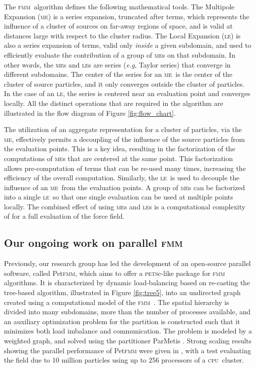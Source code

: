 \documentclass[10pt,twocolumn]{article}
\newcommand{\petfmm}{Pet\textsc{fmm}\xspace}
\newcommand{\petsc}{\textsc{pets}c\xspace}
\newcommand{\fmm}{\textsc{fmm}\xspace}
\newcommand{\cpu}{\textsc{cpu}}
\newcommand{\ME}{\textsc{me}}
\newcommand{\LE}{\textsc{le}}
\newlength{\up}
\begin{document}
The \fmm\ algorithm defines the following mathematical tools. The Multipole Expansion (\ME) is a series expansion, truncated after  terms, which represents the influence of a cluster of sources on far-away regions of space, and is valid at distances large with respect to the cluster radius. The Local Expansion (\LE) is also a series expansion of  terms, valid only \emph{inside} a given subdomain, and used to efficiently evaluate the contribution of a group of \ME s on that subdomain.
In other words, the \ME s and \LE s are series (\emph{e.g}, Taylor series) that converge in different subdomains. The center of the series for an \ME\ is the center of the cluster of source particles, and it only converges outside the cluster of particles. In the case of an \LE, the series is centered near an evaluation point and converges locally. All the distinct operations that are required in the algorithm are illustrated in the flow diagram of Figure \ref{fig:flow_chart}.

The utilization of an aggregate representation for a cluster of particles, via the \ME, effectively permits a decoupling of the influence of the source particles from the evaluation points.  This is a key idea, resulting in the factorization of the computations of \ME s that are centered at the same point.  This factorization allows pre-computation of terms that can be re-used many times, increasing the efficiency of the overall computation. Similarly, the \LE\ is used to decouple the influence of an \ME\ from the evaluation points.  A group of \ME s can be factorized into a single \LE\ so that one single evaluation can be used at multiple points locally.  The combined effect of using \ME s and \LE s is a computational complexity of  for a full evaluation of the force field.





\subsection{Our ongoing work on parallel \fmm}
 

Previously, our research group has led the development of an open-source parallel software, called \petfmm, which aims to offer a \petsc-like package for \fmm algorithms.  It is characterized by dynamic load-balancing based on re-casting the tree-based algorithm, illustrated in Figure \ref{fig:tree5}, into an undirected graph created using a computational model of the \fmm~\cite[]{CruzKnepleyBarba2010}. The spatial hierarchy is divided into many subdomains, more than the number of processes available, and an auxiliary optimization problem for the partition is constructed such that it minimizes both load imbalance and communication. The problem is modeled by a weighted graph, and solved using the partitioner ParMetis \cite[]{KarypisKumar98}.  
Strong scaling results showing the parallel performance of \petfmm were given in \cite{CruzKnepleyBarba2010}, with a test evaluating the field due to 10 million particles using up to 256 processors of a \cpu\ cluster.
\end{document}
